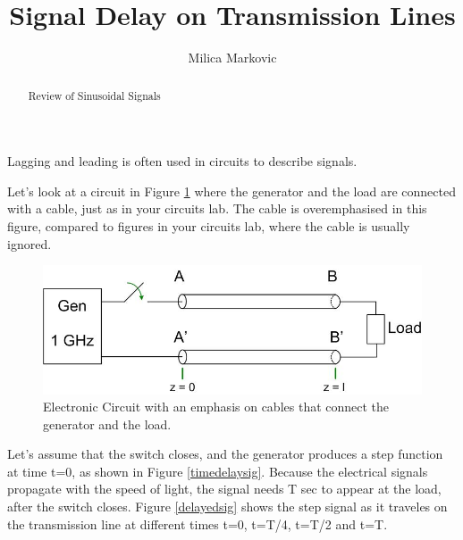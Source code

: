 \documentclass{ximera}
\title{Signal Delay on Transmission Lines}
\author{Milica Markovic}
\begin{document}
  
\begin{abstract}  
Review of Sinusoidal Signals
\end{abstract}  
\maketitle




Lagging and leading is often used in circuits to describe signals.

Let's look at a circuit in Figure \ref{elcric} where the generator and the load are connected with a cable, just as in your circuits lab. The cable is overemphasised in this figure, compared to figures in your circuits lab, where the cable is usually ignored. 



\begin{figure}[htbp]
\begin{center}
\includegraphics[scale=0.5]{jpg/generaltransmissionlinecircuit1.jpg}
\end{center}
\caption{Electronic Circuit with an emphasis on cables that connect the generator and the load.}
\label{elcric}
\end{figure}

Let's assume that the switch closes, and the generator produces a step function at time t=0, as shown in Figure  \ref{timedelaysig}. Because the electrical signals propagate with the speed of light, the signal needs T sec to appear at the load, after the switch closes. Figure \ref{delayedsig} shows the step signal as it traveles on the transmission line at different times t=0, t=T/4, t=T/2 and t=T.
\end{document}
